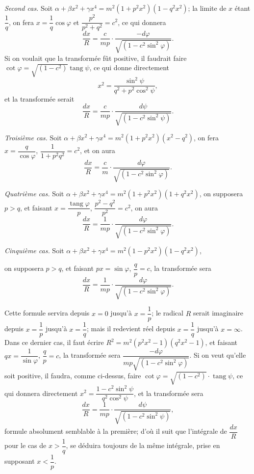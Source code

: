 \documentclass{article}
\begin{document}
\emph{Second cas.} Soit $\alpha+\beta x^{2}+\gamma x^{4}=m^{2}(1+p^{2}x^{2})(1-q^{2}x^{2})$; la limite de $x$ étant $\dfrac{1}{q}$, on fera $x=\dfrac{1}{q}\cos\varphi$ et $\dfrac{p^{2}}{p^{2}+q^{2}}=c^{2}$, ce qui donnera
\[ \frac{dx}{R}=\frac{c}{mp}\cdot\frac{-d\varphi}{\sqrt{(1-c^{2}\sin^{2}\varphi)}}. \]
Si on voulait que la transformée fût positive, il faudrait faire $\cot\varphi=\sqrt{(1-c^{2})}\operatorname{tang}\psi$, ce qui donne directement
\[ x^{2}=\frac{\sin^{2}\psi}{q^{2}+p^{2}\cos^{2}\psi}, \]
et la transformée serait
\[ \frac{dx}{R}=\frac{c}{mp}\cdot\frac{d\psi}{\sqrt{(1-c^{2}\sin^{2}\psi)}}. \]

\emph{Troisième cas.} Soit $\alpha+\beta x^{2}+\gamma x^{4}=m^{2}(1+p^{2}x^{2})(x^{2}-q^{2})$, on fera $x=\dfrac{q}{\cos\varphi}$, $\dfrac{1}{1+p^{2}q^{2}}=c^{2}$, et on aura
\[ \frac{dx}{R}=\frac{c}{m}\cdot\frac{d\varphi}{\sqrt{(1-c^{2}\sin^{2}\varphi)}}. \]

\emph{Quatrième cas.} Soit $\alpha+\beta x^{2}+\gamma x^{4}=m^{2}(1+p^{2}x^{2})(1+q^{2}x^{2})$, on supposera $p>q$, et faisant $x=\dfrac{\operatorname{tang}\varphi}{p}$, $\dfrac{p^{2}-q^{2}}{p^{2}}=c^{2}$, on aura
\[ \frac{dx}{R}=\frac{1}{mp}\cdot\frac{d\varphi}{\sqrt{(1-c^{2}\sin^{2}\varphi)}}. \]

\emph{Cinquième cas.} Soit $\alpha+\beta x^{2}+\gamma x^{4}=m^{2}(1-p^{2}x^{2})(1-q^{2}x^{2})$,

on supposera $p>q$, et faisant $px=\sin\varphi$, $\dfrac{q}{p}=c$, la transformée sera
\[ \frac{dx}{R}=\frac{1}{mp}\cdot\frac{d\varphi}{\sqrt{(1-c^{2}\sin^{2}\varphi)}}. \]

Cette formule servira depuis $x=0$ jusqu'à $x=\dfrac{1}{p}$; le radical $R$ serait imaginaire depuis $x=\dfrac{1}{p}$ jusqu'à $x=\dfrac{1}{q}$; mais il redevient réel depuis $x=\dfrac{1}{q}$ jusqu'à $x=\infty$. Dans ce dernier cas, il faut écrire $R^{2}=m^{2}(p^{2}x^{2}-1)(q^{2}x^{2}-1)$, et faisant $qx=\dfrac{1}{\sin\varphi}$, $\dfrac{q}{p}=c$, la transformée sera $\dfrac{-d\varphi}{mp\sqrt{(1-c^{2}\sin^{2}\varphi)}}$. Si on veut qu'elle soit positive, il faudra, comme ci-dessus, faire $\cot\varphi=\sqrt{(1-c^{2})}\cdot\operatorname{tang}\psi$, ce qui donnera directement $x^{2}=\dfrac{1-c^{2}\sin^{2}\psi}{q^{2}\cos^{2}\psi}$, et la transformée sera
\[ \frac{dx}{R}=\frac{1}{mp}\cdot\frac{d\psi}{\sqrt{(1-c^{2}\sin^{2}\psi)}}, \]
formule absolument semblable à la première; d'où il suit que l'intégrale de $\dfrac{dx}{R}$ pour le cas de $x>\dfrac{1}{q}$, se déduira toujours de la même intégrale, prise en supposant $x<\dfrac{1}{p}$.
\end{document}
